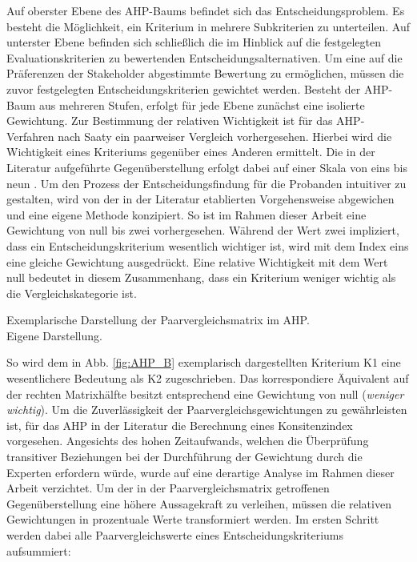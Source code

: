 Auf oberster Ebene des AHP-Baums befindet sich das Entscheidungsproblem. Es besteht die Möglichkeit, ein Kriterium in mehrere Subkriterien zu unterteilen. Auf unterster Ebene befinden sich schließlich die im Hinblick auf die festgelegten Evaluationskriterien zu bewertenden Entscheidungsalternativen. Um eine auf die Präferenzen der Stakeholder abgestimmte Bewertung zu ermöglichen, müssen die zuvor festgelegten Entscheidungskriterien gewichtet werden. Besteht der AHP-Baum aus mehreren Stufen, erfolgt für jede Ebene zunächst eine isolierte Gewichtung. Zur Bestimmung der relativen Wichtigkeit ist für das AHP-Verfahren nach Saaty ein paarweiser Vergleich vorhergesehen. Hierbei wird die Wichtigkeit eines Kriteriums gegenüber eines Anderen ermittelt. Die in der Literatur aufgeführte Gegenüberstellung erfolgt dabei auf einer Skala von eins bis neun \cite[86]{Saaty.2008}. Um den Prozess der Entscheidungsfindung für die Probanden intuitiver zu gestalten, wird von der in der Literatur etablierten Vorgehensweise abgewichen und eine eigene Methode konzipiert. So ist im Rahmen dieser Arbeit eine Gewichtung von null bis zwei vorhergesehen. Während der Wert zwei impliziert, dass ein Entscheidungskriterium wesentlich wichtiger ist, wird mit dem Index eins eine gleiche Gewichtung ausgedrückt. Eine relative Wichtigkeit mit dem Wert null bedeutet in diesem Zusammenhang, dass ein Kriterium weniger wichtig als die Vergleichskategorie ist.  
\begin{center}
	\begin{table}[H]
		\centering
		\caption[Exemplarische Darstellung der Paarvergleichsmatrix im AHP]{Exemplarische Darstellung der Paarvergleichsmatrix im AHP.\\ Eigene Darstellung.}
		\label{fig:AHP_B}
	\end{table}
\end{center}
\vspace*{-15mm}
So wird dem in Abb. \ref{fig:AHP_B} exemplarisch dargestellten Kriterium K1 eine wesentlichere Bedeutung als K2 zugeschrieben. Das korrespondiere Äquivalent auf der rechten Matrixhälfte besitzt entsprechend eine Gewichtung von null (\textit{weniger wichtig}). Um die Zuverlässigkeit der Paarvergleichsgewichtungen zu gewährleisten ist, für das AHP in der Literatur die Berechnung eines Konsitenzindex vorgesehen. Angesichts des hohen Zeitaufwands, welchen die Überprüfung transitiver Beziehungen bei der Durchführung der Gewichtung durch die Experten erfordern würde, wurde auf eine derartige Analyse im Rahmen dieser Arbeit verzichtet. Um der in der Paarvergleichsmatrix getroffenen Gegenüberstellung eine höhere Aussagekraft zu verleihen, müssen die relativen Gewichtungen in prozentuale Werte transformiert werden. Im ersten Schritt werden dabei alle Paarvergleichswerte eines Entscheidungskriteriums aufsummiert:\\
